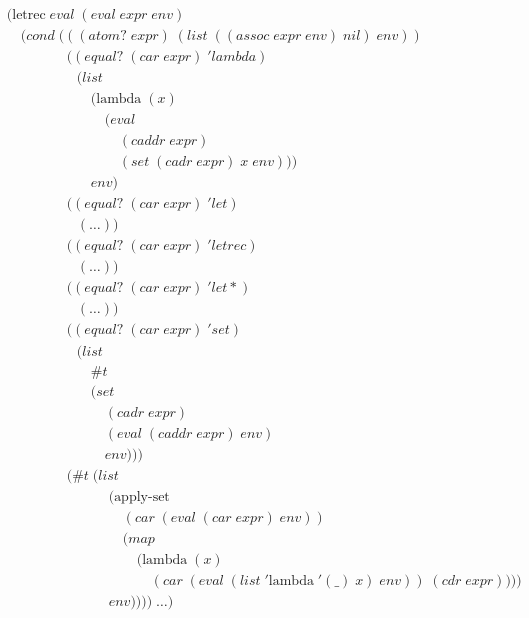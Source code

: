 \begin{align*}
& (\text{letrec} \; eval \; (eval \; expr \; env)
\\& \quad (cond \; (((atom? \; expr) \; (list \; ((assoc \; expr \; env) \; nil) \; env))
\\& \qquad \qquad \; ((equal? \; (car \; expr) \; 'lambda) \; 
\\& \qquad \qquad \quad (list
\\& \qquad \qquad \qquad (\text{lambda} \; (x) \; 
\\& \qquad \qquad \qquad \quad (eval \; 
\\& \qquad \qquad \qquad \qquad (caddr \; expr) \; 
\\& \qquad \qquad \qquad \qquad (set \; (cadr \; expr) \; x \; env)))
\\& \qquad \qquad \qquad env)
\\& \qquad \qquad \; ((equal? \; (car \; expr) \; 'let)
\\& \qquad \qquad \quad (\dots))
\\& \qquad \qquad \; ((equal? \; (car \; expr) \; 'letrec)
\\& \qquad \qquad \quad (\dots))
\\& \qquad \qquad \; ((equal? \; (car \; expr) \; 'let*) \; 
\\& \qquad \qquad \quad (\dots))
\\& \qquad \qquad \; ((equal? \; (car \; expr) \; 'set)
\\& \qquad \qquad \quad (list \; 
\\& \qquad \qquad \qquad \#t \; 
\\& \qquad \qquad \qquad (set \; 
\\& \qquad \qquad \qquad \quad (cadr \; expr) \; 
\\& \qquad \qquad \qquad \quad (eval \; (caddr \; expr) \; env) \; 
\\& \qquad \qquad \qquad \quad env)))
\\& \qquad \qquad \; (\#t \; (list
\\& \qquad \qquad \qquad \quad \; (\text{apply-set} \; 
\\& \qquad \qquad \qquad \qquad \; (car \; (eval \; (car \; expr) \; env))
\\& \qquad \qquad \qquad \qquad \; (map \; 
\\& \qquad \qquad \qquad \qquad \quad \; (\text{lambda} \; (x) \; 
\\& \qquad \qquad \qquad \qquad \qquad \; (car \; (eval \; (list \; '\text{lambda} \; '(\_) \; x) \; env)) \; (cdr \; expr))))
\\& \qquad \qquad \qquad \quad \; env)))) \; \dots)
\end{align*}

